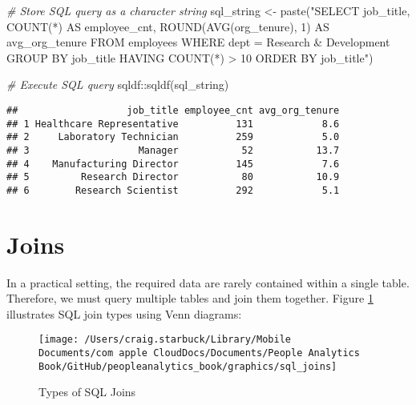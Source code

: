 \documentclass[
]{book}
\newenvironment{Shaded}{\begin{snugshade}}{\end{snugshade}}
\newcommand{\CommentTok}[1]{\textcolor[rgb]{0.56,0.35,0.01}{\textit{#1}}}
\newcommand{\FunctionTok}[1]{\textcolor[rgb]{0.00,0.00,0.00}{#1}}
\newcommand{\NormalTok}[1]{#1}
\newcommand{\OtherTok}[1]{\textcolor[rgb]{0.56,0.35,0.01}{#1}}
\newcommand{\SpecialCharTok}[1]{\textcolor[rgb]{0.00,0.00,0.00}{#1}}
\newcommand{\StringTok}[1]{\textcolor[rgb]{0.31,0.60,0.02}{#1}}
\begin{document}
\begin{Shaded}
\begin{Highlighting}[]
\CommentTok{\# Store SQL query as a character string}
\NormalTok{sql\_string }\OtherTok{\textless{}{-}} \FunctionTok{paste}\NormalTok{(}\StringTok{"SELECT}
\StringTok{                      job\_title,}
\StringTok{                      COUNT(*) AS employee\_cnt,}
\StringTok{                      ROUND(AVG(org\_tenure), 1) AS avg\_org\_tenure}
\StringTok{                    FROM}
\StringTok{                      employees}
\StringTok{                    WHERE}
\StringTok{                      dept = \textquotesingle{}Research \& Development\textquotesingle{}}
\StringTok{                    GROUP BY}
\StringTok{                      job\_title}
\StringTok{                    HAVING}
\StringTok{                      COUNT(*) \textgreater{} 10}
\StringTok{                    ORDER BY}
\StringTok{                      job\_title"}\NormalTok{)}

\CommentTok{\# Execute SQL query}
\NormalTok{sqldf}\SpecialCharTok{::}\FunctionTok{sqldf}\NormalTok{(sql\_string)}
\end{Highlighting}
\end{Shaded}

\begin{verbatim}
##                   job_title employee_cnt avg_org_tenure
## 1 Healthcare Representative          131            8.6
## 2     Laboratory Technician          259            5.0
## 3                   Manager           52           13.7
## 4    Manufacturing Director          145            7.6
## 5         Research Director           80           10.9
## 6        Research Scientist          292            5.1
\end{verbatim}

\hypertarget{joins}{%
\section{Joins}\label{joins}}

In a practical setting, the required data are rarely contained within a single table. Therefore, we must query multiple tables and join them together. Figure \ref{fig:sql-joins} illustrates SQL join types using Venn diagrams:

\begin{figure}

{\centering \texttt{[image: /Users/craig.starbuck/Library/Mobile Documents/com~apple~CloudDocs/Documents/People Analytics Book/GitHub/peopleanalytics\_book/graphics/sql\_joins]} 

}

\caption{Types of SQL Joins}\label{fig:sql-joins}
\end{figure}
\end{document}
